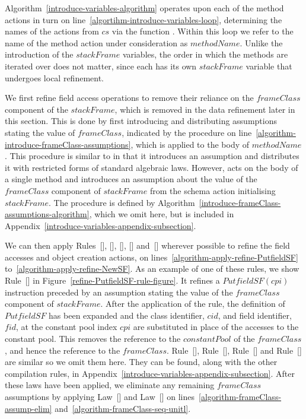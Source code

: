 Algorithm~\ref{introduce-variables-algorithm} operates upon each of
the method actions in turn on
line~\ref{algortihm-introduce-variables-loop}, determining the names
of the actions from $cs$ via the function .
Within this loop we refer to the name of the method action under
consideration as $methodName$.
Unlike the introduction of the $stackFrame$ variables, the order in
which the methods are iterated over does not matter, since each has
its own $stackFrame$ variable that undergoes local refinement.

We first refine field access operations to remove their reliance on
the $frameClass$ component of the $stackFrame$, which is removed in
the data refinement later in this section.
This is done by first introducing and distributing assumptions stating
the value of $frameClass$, indicated by the procedure
 on
line~\ref{algorithm-introduce-frameClass-assumptions}, which is
applied to the body of $methodName$.
This procedure is similar to 
in that it introduces an assumption and distributes it with restricted
forms of standard algebraic laws.
However,  acts on the body of a
single method and introduces an assumption about the value of the
$frameClass$ component of $stackFrame$ from the schema action
initialising $stackFrame$.
The  procedure is defined by
Algorithm~\ref{introduce-frameClass-assumptions-algorithm}, which we
omit here, but is included in
Appendix~\ref{introduce-variables-appendix-subsection}.

We can then apply Rules~[],
[],
[],
[] and~[]
wherever possible to refine the field accesses and object creation
actions, on lines~\ref{algorithm-apply-refine-PutfieldSF}
to~\ref{algorithm-apply-refine-NewSF}.
As an example of one of these rules, we show
Rule~[] in
Figure~\ref{refine-PutfieldSF-rule-figure}.
It refines a $PutfieldSF(cpi)$ instruction preceded by an assumption
stating the value of the $frameClass$ component of $stackFrame$.
After the application of the rule, the definition of $PutfieldSF$ has
been expanded and the class identifier, $cid$, and field identifier,
$fid$, at the constant pool index $cpi$ are substituted in place of
the accesses to the constant pool.
This removes the reference to the $constantPool$ of the $frameClass$,
and hence the reference to the $frameClass$.
Rule~[],
Rule~[],
Rule~[] and
Rule~[] are similar so we omit them here.
They can be found, along with the other compilation rules, in
Appendix~\ref{introduce-variables-appendix-subsection}.
After these laws have been applied, we eliminate any remaining
$frameClass$ assumptions by applying Law~[]
and Law~[] on
lines~\ref{algorithm-frameClass-assump-elim}
and~\ref{algorithm-frameClass-seq-unitl}.

